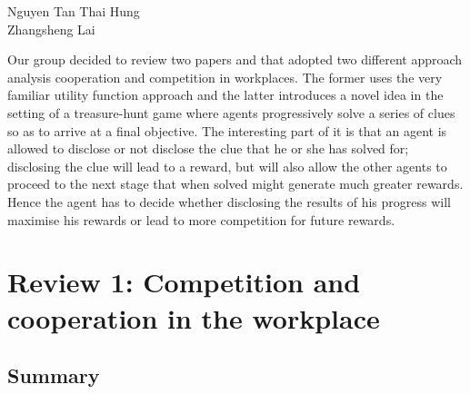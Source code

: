 \documentclass[a4paper,10pt]{article}
\theoremstyle{definition}
\begin{document}
\begin{flushright}
Nguyen Tan Thai Hung\\
Zhangsheng Lai\\
\end{flushright}
Our group decided to review two papers \cite{drago1991} and \cite{Banerjee2014} that adopted two different approach analysis cooperation and competition in workplaces. The former uses the very familiar utility function approach and the latter introduces a novel idea in the setting of a treasure-hunt game where agents progressively solve a series of clues so as to arrive at a final objective. The interesting part of it is that an agent is allowed to disclose or not disclose the clue that he or she has solved for; disclosing the clue will lead to a reward, but will also allow the other agents to proceed to the next stage that when solved might generate much greater rewards. Hence the agent has to decide whether disclosing the results of his progress will maximise his rewards or lead to more competition for future rewards.


\section*{Review 1: Competition and cooperation in the
workplace}
\subsection*{Summary}
\end{document}
